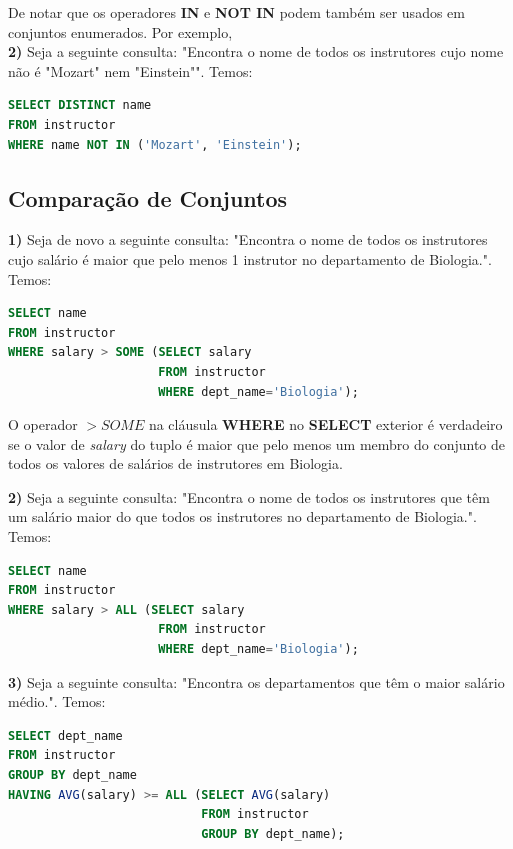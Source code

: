 \documentclass[oneside]{book}
\theoremstyle{definition}
\begin{document}
De notar que os operadores \textbf{IN} e \textbf{NOT IN} podem também ser usados em conjuntos enumerados. Por exemplo, \\
\textbf{2)} Seja a seguinte consulta: "Encontra o nome de todos os instrutores cujo nome não é "Mozart" nem "Einstein"". Temos:
\begin{lstlisting}[language=SQL, morekeywords={REFERENCES, REFRESH, MATERIALIZED, CONCURRENTLY}, framesep=8pt, xleftmargin=40pt, framexleftmargin=40pt, frame=tb, framerule=0pt]
SELECT DISTINCT name
FROM instructor
WHERE name NOT IN ('Mozart', 'Einstein');
\end{lstlisting}

\subsection{Comparação de Conjuntos}
\textbf{1)} Seja de novo a seguinte consulta: "Encontra o nome de todos os instrutores cujo salário é maior que pelo menos 1 instrutor no departamento de Biologia.". Temos:
\begin{lstlisting}[language=SQL, morekeywords={REFERENCES, REFRESH, MATERIALIZED, CONCURRENTLY}, framesep=8pt, xleftmargin=40pt, framexleftmargin=40pt, frame=tb, framerule=0pt]
SELECT name
FROM instructor 
WHERE salary > SOME (SELECT salary
                     FROM instructor
                     WHERE dept_name='Biologia');
\end{lstlisting}

O operador $> SOME$ na cláusula \textbf{WHERE} no \textbf{SELECT} exterior é verdadeiro se o valor de \textit{salary} do tuplo é maior que pelo menos um membro do conjunto de todos os valores de salários de instrutores em Biologia.

\textbf{2)} Seja a seguinte consulta: "Encontra o nome de todos os instrutores que têm um salário maior do que todos os instrutores no departamento de Biologia.". Temos:
\begin{lstlisting}[language=SQL, morekeywords={REFERENCES, REFRESH, MATERIALIZED, CONCURRENTLY}, framesep=8pt, xleftmargin=40pt, framexleftmargin=40pt, frame=tb, framerule=0pt]
SELECT name
FROM instructor 
WHERE salary > ALL (SELECT salary
                     FROM instructor
                     WHERE dept_name='Biologia');
\end{lstlisting}

\textbf{3)} Seja a seguinte consulta: "Encontra os departamentos que têm o maior salário médio.". Temos:
\begin{lstlisting}[language=SQL, morekeywords={REFERENCES, REFRESH, MATERIALIZED, CONCURRENTLY}, framesep=8pt, xleftmargin=40pt, framexleftmargin=40pt, frame=tb, framerule=0pt]
SELECT dept_name
FROM instructor 
GROUP BY dept_name
HAVING AVG(salary) >= ALL (SELECT AVG(salary)
                           FROM instructor
                           GROUP BY dept_name);
\end{lstlisting}
\end{document}
